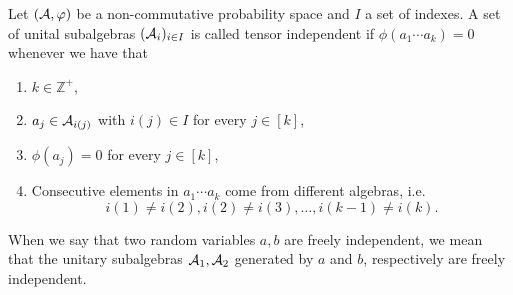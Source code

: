 




    \begin{definition}
        Let $(\mathcal A, \varphi)$ be a non-commutative probability space and $I$ a set of indexes. A set of unital subalgebras $(\mathcal A_{i})_{i\in I}$ is called tensor independent if $\phi(a_1 \cdots a_k) = 0$ whenever we have that

        \begin{enumerate}
            \item $k \in \mathbb Z^+$,
            \item $a_j \in \mathcal A_{i(j)}$ with $i(j) \in I$ for every $j \in [k]$,
            \item $\phi(a_j) = 0$ for every $j \in [k]$,
            \item Consecutive elements in $a_1 \cdots a_k$ come from different algebras, i.e.
            \begin{equation*}
                i(1) \neq i(2), i(2) \neq i(3), \dots, i(k-1) \neq i(k).
            \end{equation*}
        \end{enumerate}

        When we say that two random variables $a,b$ are freely independent, we mean that the unitary subalgebras $\mathcal A_1, \mathcal A_2$ generated by $a$ and $b$, respectively are freely independent.

    \end{definition}



